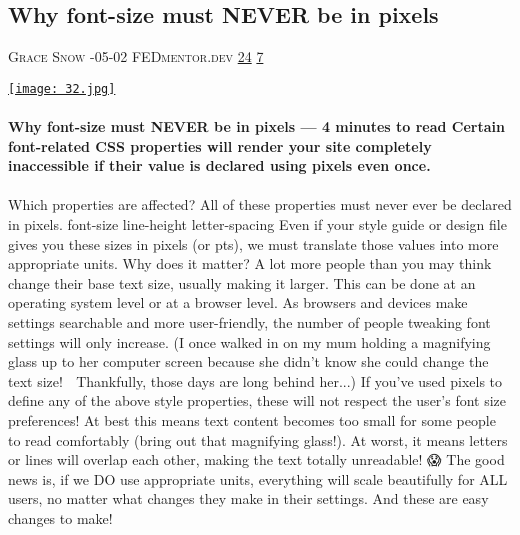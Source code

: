 \documentclass[10pt,a4paper]{article}
\begin{document}
\begin{multicols}{2}
\begin{minipage}{\linewidth}
\subsection{Why font-size must NEVER be in pixels}
\textsc{\footnotesize
{\scriptsize\faUser}\space 
Grace Snow 
{\scriptsize\faCalendar}-05-02 
{\scriptsize\faGlobe}\space 
FEDmentor.dev 
{\scriptsize\faThumbsOUp}\space 
\href{http://news.ycombinator.com/item?id=37124019\&utm\_term=comment}{24} 
{\scriptsize\faComments}\space 
\href{http://news.ycombinator.com/item?id=37124019\&utm\_term=comment}{7} 
}
\par\medskip\noindent
\href{https://FEDmentor.dev/posts/font-size-px/?utm\_source=hackernewsletter\&utm\_medium=email\&utm\_term=design}{
    \texttt{[image: 32.jpg]}
}
\end{minipage}
\paragraph{}
\textbf{Why font-size must NEVER be in pixels
— 4 minutes to read
Certain font-related CSS properties will render your site completely inaccessible if their value is declared using pixels even once.}
\paragraph{}

Which properties are affected?
All of these properties must never ever be declared in pixels.
font-size
line-height
letter-spacing
Even if your style guide or design file gives you these sizes in pixels (or pts), we must translate those values into more appropriate units.
Why does it matter?
A lot more people than you may think change their base text size, usually making it larger. This can be done at an operating system level or at a browser level.
As browsers and devices make settings searchable and more user-friendly, the number of people tweaking font settings will only increase. (I once walked in on my mum holding a magnifying glass up to her computer screen because she didn't know she could change the text size! 🤭 Thankfully, those days are long behind her...)
If you've used pixels to define any of the above style properties, these will not respect the user's font size preferences!
At best this means text content becomes too small for some people to read comfortably (bring out that magnifying glass!). At worst, it means letters or lines will overlap each other, making the text totally unreadable! 😱
The good news is, if we DO use appropriate units, everything will scale beautifully for ALL users, no matter what changes they make in their settings. And these are easy changes to make!


\end{multicols}
\end{document}
